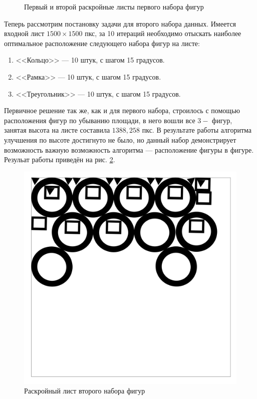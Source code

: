\documentclass[14pt]{extarticle}
\begin{document}
\begin{figure}[h]
		\caption{Первый и второй раскройные листы первого набора фигур}
		\label{set1}
	\end{figure}

	Теперь рассмотрим постановку задачи для второго набора данных. Имеется входной лист $1500\times1500$ пкс, за 10 итераций необходимо отыскать наиболее оптимальное расположение следующего набора фигур на листе:
	\begin{enumerate}
		\item <<Кольцо>> --- 10 штук, с шагом 15 градусов.
		\item <<Рамка>> --- 10 штук, с шагом 15 градусов.
		\item <<Треугольник>> --- 10 штук, с шагом 15 градусов.
	\end{enumerate}

	Первичное решение так же, как и для первого набора, строилось с помощью расположения фигур по убыванию площади, в него вошли все $3-$ фигур, занятая высота на листе составила $1388,258$ пкс. В результате работы алгоритма улучшения по высоте достигнуто не было, но данный набор демонстрирует возможность важную возможность алгоритма --- расположение фигуры в фигуре. Резульат работы приведён на рис. \ref{set2}.
	\begin{figure}[h]
		\centering
		\includegraphics[scale=0.18]{set2}
		\caption{Раскройный лист второго набора фигур}
		\label{set2}
	\end{figure}
	
\end{document}
